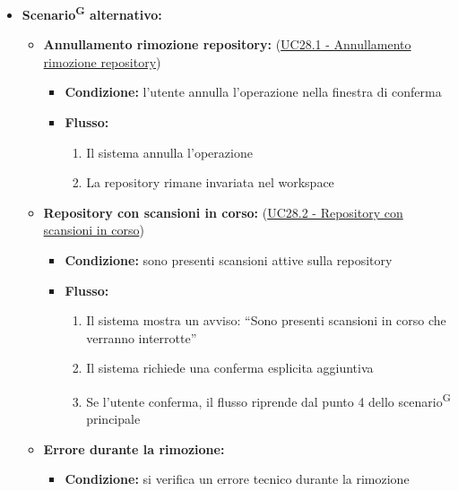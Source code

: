 \documentclass[a4paper, 11pt]{article}
\begin{document}
\begin{itemize}
\begin{enumerate}
		\item Il sistema rimuove la repository dal workspace
		\item Il sistema elimina tutti i dati di analisi, scansioni, configurazioni associate alla repository
		\item Il sistema aggiorna la visualizzazione e mostra un messaggio di conferma dell'avvenuta rimozione
	\end{enumerate}
	\item \textbf{Scenario\textsuperscript{G} alternativo:}
	\begin{itemize}
		\item \textbf{Annullamento rimozione repository:} (\hyperref[UC28.1]{UC28.1 - Annullamento rimozione repository})
			\begin{itemize}
				\item \textbf{Condizione:} l'utente annulla l'operazione nella finestra di conferma
				\item \textbf{Flusso:} 
				\begin{enumerate}
					\item Il sistema annulla l'operazione
					\item La repository rimane invariata nel workspace
				\end{enumerate}
			\end{itemize}
		\item \textbf{Repository con scansioni in corso:} (\hyperref[UC28.2]{UC28.2 - Repository con scansioni in corso})
			\begin{itemize}
				\item \textbf{Condizione:} sono presenti scansioni attive sulla repository
				\item \textbf{Flusso:} 
				\begin{enumerate}
					\item Il sistema mostra un avviso: “Sono presenti scansioni in corso che verranno interrotte”
					\item Il sistema richiede una conferma esplicita aggiuntiva
					\item Se l'utente conferma, il flusso riprende dal punto 4 dello scenario\textsuperscript{G} principale
				\end{enumerate}
			\end{itemize}
		\item \textbf{Errore durante la rimozione:} 
			\begin{itemize}
				\item \textbf{Condizione:} si verifica un errore tecnico durante la rimozione

\end{itemize}
\end{itemize}
\end{itemize}
\end{document}
